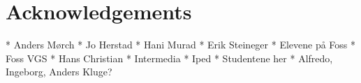 \chapter{Acknowledgements}

* Anders Mørch
* Jo Herstad
* Hani Murad
* Erik Steineger
* Elevene på Foss
* Foss VGS
* Hans Christian
* Intermedia
* Iped
* Studentene her
* Alfredo, Ingeborg, Anders Kluge?

\newpage